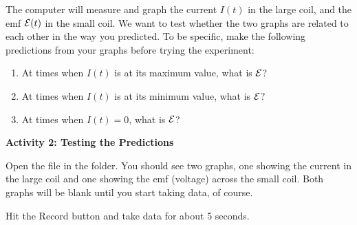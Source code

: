 The computer will measure and graph
the current $I(t)$ in the large coil, and the emf ${\cal E}(t)$
in the small coil.  We want to test whether the two graphs are related
to each other in the way you predicted.  To be specific, make the following
predictions from your graphs before trying the experiment:

\begin{enumerate}[labparts]
\item At times when $I(t)$ is at its maximum value, what is ${\cal E}$?
\answerspace{.7in}

\item At times when $I(t)$ is at its minimum value, what is ${\cal E}$?
\answerspace{.7in}

\item At times when $I(t)=0$, what is ${\cal E}$?
\answerspace{.7in}
\end{enumerate}

\pagebreak[2]

{\bf Activity 2: Testing the Predictions}

Open the file  in the \filename{\coursefolder} folder.  You should see two graphs,
one showing the current in the large coil and one showing the emf (voltage)
across the small coil.  Both graphs will be blank until you start taking
data, of course.  

Hit the Record button and take data for about 5 seconds.  

